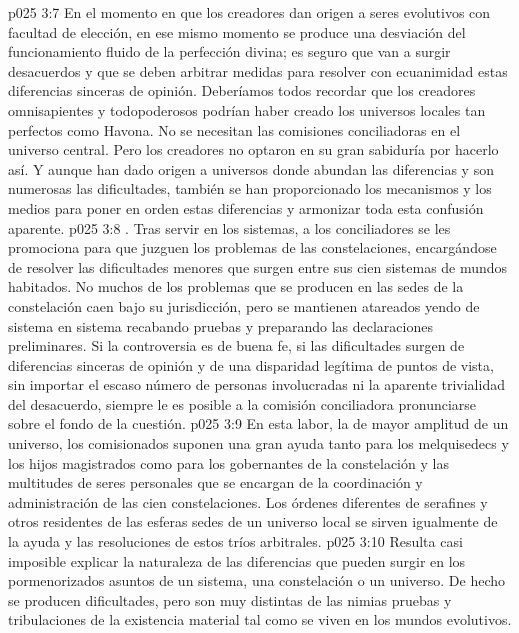 \vs p025 3:7 En el momento en que los creadores dan origen a seres evolutivos con facultad de elección, en ese mismo momento se produce una desviación del funcionamiento fluido de la perfección divina; es seguro que van a surgir desacuerdos y que se deben arbitrar medidas para resolver con ecuanimidad estas diferencias sinceras de opinión. Deberíamos todos recordar que los creadores omnisapientes y todopoderosos podrían haber creado los universos locales tan perfectos como Havona. No se necesitan las comisiones conciliadoras en el universo central. Pero los creadores no optaron en su gran sabiduría por hacerlo así. Y aunque han dado origen a universos donde abundan las diferencias y son numerosas las dificultades, también se han proporcionado los mecanismos y los medios para poner en orden estas diferencias y armonizar toda esta confusión aparente.
\vs p025 3:8 . Tras servir en los sistemas, a los conciliadores se les promociona para que juzguen los problemas de las constelaciones, encargándose de resolver las dificultades menores que surgen entre sus cien sistemas de mundos habitados. No muchos de los problemas que se producen en las sedes de la constelación caen bajo su jurisdicción, pero se mantienen atareados yendo de sistema en sistema recabando pruebas y preparando las declaraciones preliminares. Si la controversia es de buena fe, si las dificultades surgen de diferencias sinceras de opinión y de una disparidad legítima de puntos de vista, sin importar el escaso número de personas involucradas ni la aparente trivialidad del desacuerdo, siempre le es posible a la comisión conciliadora pronunciarse sobre el fondo de la cuestión.
\vs p025 3:9  En esta labor, la de mayor amplitud de un universo, los comisionados suponen una gran ayuda tanto para los melquisedecs y los hijos magistrados como para los gobernantes de la constelación y las multitudes de seres personales que se encargan de la coordinación y administración de las cien constelaciones. Los órdenes diferentes de serafines y otros residentes de las esferas sedes de un universo local se sirven igualmente de la ayuda y las resoluciones de estos tríos arbitrales.
\vs p025 3:10 Resulta casi imposible explicar la naturaleza de las diferencias que pueden surgir en los pormenorizados asuntos de un sistema, una constelación o un universo. De hecho se producen dificultades, pero son muy distintas de las nimias pruebas y tribulaciones de la existencia material tal como se viven en los mundos evolutivos.
